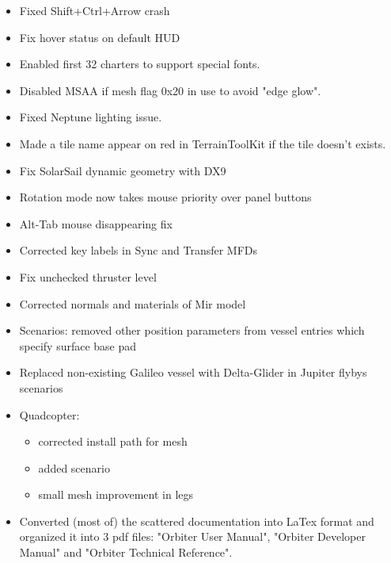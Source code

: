 \documentclass[Orbiter User Manual.tex]{subfiles}
\begin{document}
\begin{itemize}
	\item Fixed Shift+Ctrl+Arrow crash
	\item Fix hover status on default HUD
	\item Enabled first 32 charters to support special fonts.
	\item Disabled MSAA if mesh flag 0x20 in use to avoid "edge glow".
	\item Fixed Neptune lighting issue.
	\item Made a tile name appear on red in TerrainToolKit if the tile doesn't exists.
	\item Fix SolarSail dynamic geometry with DX9
	\item Rotation mode now takes mouse priority over panel buttons
	\item Alt-Tab mouse disappearing fix
	\item Corrected key labels in Sync and Transfer MFDs
	\item Fix unchecked thruster level
	\item Corrected normals and materials of Mir model
	\item Scenarios: removed other position parameters from vessel entries which specify surface base pad
	\item Replaced non-existing Galileo vessel with Delta-Glider in Jupiter flybys scenarios
	\item Quadcopter:
	\begin{itemize}
		\item corrected install path for mesh
		\item added scenario
		\item small mesh improvement in legs
	\end{itemize}
	\item Converted (most of) the scattered documentation into LaTex format and organized it into 3 pdf files: "Orbiter User Manual", "Orbiter Developer Manual" and "Orbiter Technical Reference".
\end{itemize}
\end{document}
